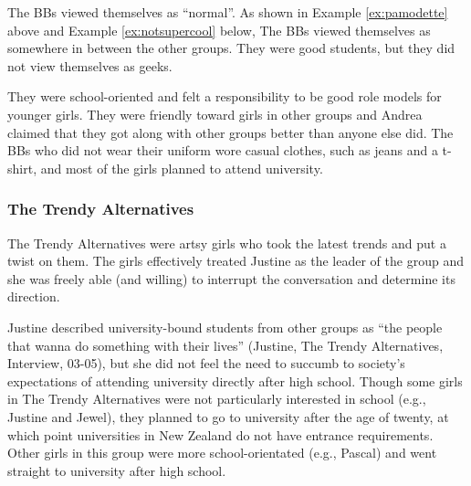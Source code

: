 The BBs viewed themselves as ``normal''. As shown in Example \ref{ex:pamodette} above and Example \ref{ex:notsupercool} below, The BBs viewed themselves as somewhere in between the other groups. They were good students, but they did not view themselves as geeks.

\label{ex:notsupercool}

\vspace{5 mm}

They were school-oriented and felt a responsibility to be good role models for younger girls. They were friendly toward girls in other groups and Andrea claimed that they got along with other groups better than anyone else did. The BBs who did not wear their uniform wore casual clothes, such as jeans and a t-shirt, and most of the girls planned to attend university. 


\subsubsection{The Trendy Alternatives}
The Trendy Alternatives were artsy girls who took the latest trends and put a twist on them. The girls effectively treated Justine as the leader of the group and she was freely able (and willing) to interrupt the conversation and determine its direction.

Justine described university-bound students from other groups as ``the people that wanna do something with their lives'' (Justine, The Trendy Alternatives, Interview, 03-05), but she did not feel the need to succumb to society's expectations of attending university directly after high school. Though some girls in The Trendy Alternatives were not particularly interested in school (e.g., Justine and Jewel), they planned to go to university after the age of twenty, at which point universities in New Zealand do not have entrance requirements. Other girls in this group were more school-orientated (e.g., Pascal) and went straight to university after high school. 

